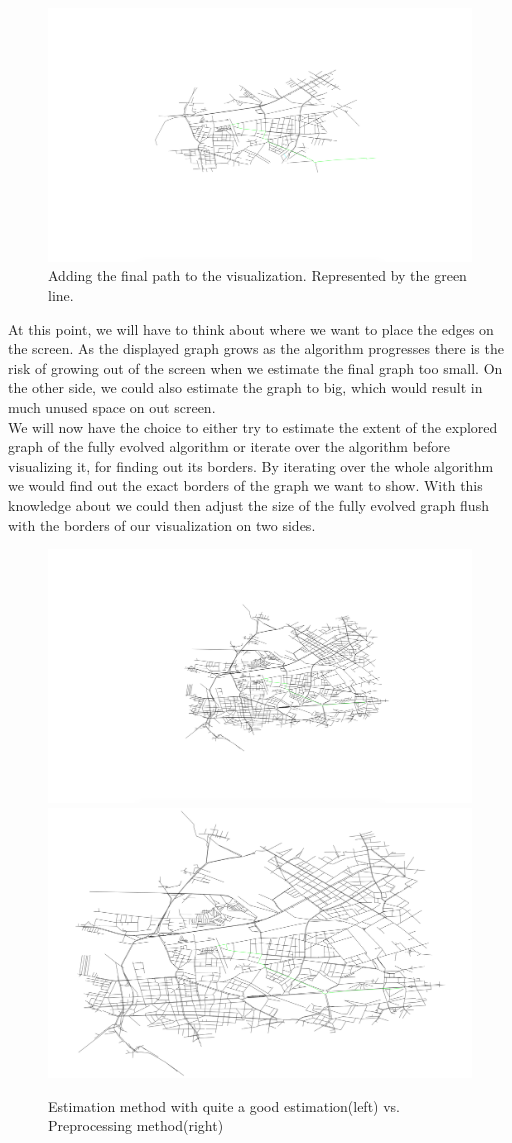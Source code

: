 \documentclass
[
	paper = a4,
    pagesize,
	12 pt,
	oneside,                       %
    open = right,
	DIV = calc,
	BCOR = 0 mm,                   %
	bibtotoc
]
{scrbook}
\begin{document}
\begin{figure}[H]
 \includegraphics[width=\textwidth]{Images/vis-result-path.png}
\caption[]{Adding the final path to the visualization. Represented by the green line.}
\label{fig:result-path}
\end{figure}

At this point, we will have to think about where we want to place the edges on the screen.
As the displayed graph grows as the algorithm progresses there is the risk of growing out of the screen when we estimate the final graph too small.
On the other side, we could also estimate the graph to big, which would result in much unused space on out screen.\\
We will now have the choice to either try to estimate the extent of the explored graph of the fully evolved algorithm or iterate over the algorithm before visualizing it, for finding out its borders.
By iterating over the whole algorithm we would find out the exact borders of the graph we want to show.
With this knowledge about we could then adjust the size of the fully evolved graph flush with the borders of our visualization on two sides.

\begin{figure}[H]
    \includegraphics[width=.5\textwidth]{Images/vis-estimation.png}
    \includegraphics[width=.5\textwidth]{Images/vis-preprocessing.png}
\caption[]{Estimation method with quite a good estimation(left) vs. Preprocessing method(right)}
\label{fig:sections}
\end{figure}
\end{document}
